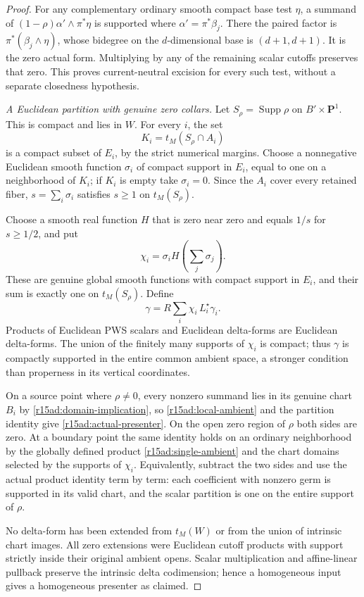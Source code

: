 \begin{proof}
For any complementary ordinary smooth compact base
test $\eta$, a summand of $(1-\rho)\alpha'\wedge\pi^*\eta$
is supported where $\alpha'=\pi^*\beta_j$.
There the paired factor is $\pi^*(\beta_j\wedge\eta)$,
whose bidegree on the $d$-dimensional base is
$(d+1,d+1)$.  It is the zero actual form.  Multiplying
by any of the remaining scalar cutoffs preserves that
zero.  This proves current-neutral excision for every
such test, without a separate closedness hypothesis.

\emph{A Euclidean partition with genuine zero collars.}
Let $S_\rho=\operatorname{Supp}\rho$ on
$B'\times\mathbf P^1$.  This is compact and lies in
$W$.  For every $i$, the set
\[
                      K_i=t_M(S_\rho\cap A_i)
\tag{AD15.6}\label{r15ad:compact-image}
\]
is a compact subset of $E_i$, by the strict numerical
margins.  Choose a nonnegative Euclidean smooth
function $\sigma_i$ of compact support in $E_i$,
equal to one on a neighborhood of $K_i$; if $K_i$
is empty take $\sigma_i=0$.  Since the $A_i$ cover
every retained fiber, $s=\sum_i\sigma_i$ satisfies
$s\geq1$ on $t_M(S_\rho)$.

Choose a smooth real function $H$ that is zero near
zero and equals $1/s$ for $s\geq1/2$, and put
\[
          \chi_i=\sigma_i H\!\left(\sum_j\sigma_j\right).
\tag{AD15.7}\label{r15ad:ambient-partition}
\]
These are genuine global smooth functions with compact
support in $E_i$, and their sum is exactly one on
$t_M(S_\rho)$.  Define
\[
           \gamma=R\sum_i\chi_i\,L_i^\star\gamma_i.
\tag{AD15.8}\label{r15ad:single-ambient}
\]
Products of Euclidean PWS scalars and Euclidean
delta-forms are Euclidean delta-forms.  The union of
the finitely many supports of $\chi_i$ is compact;
thus $\gamma$ is compactly supported in the entire
common ambient space, a stronger condition than
properness in its vertical coordinates.

On a source point where $\rho\ne0$, every nonzero
summand lies in its genuine chart $B_i$ by
\eqref{r15ad:domain-implication}, so
\eqref{r15ad:local-ambient} and the partition identity
give \eqref{r15ad:actual-presenter}.  On the open zero
region of $\rho$ both sides are zero.  At a boundary
point the same identity holds on an ordinary
neighborhood by the globally defined product
\eqref{r15ad:single-ambient} and the chart domains
selected by the supports of $\chi_i$.  Equivalently,
subtract the two sides and use the actual product
identity term by term: each coefficient with nonzero
germ is supported in its valid chart, and the scalar
partition is one on the entire support of $\rho$.

No delta-form has been extended from $t_M(W)$ or
from the union of intrinsic chart images.  All zero
extensions were Euclidean cutoff products with support
strictly inside their original ambient opens.  Scalar
multiplication and affine-linear pullback preserve
the intrinsic delta codimension; hence a homogeneous
input gives a homogeneous presenter as claimed.
\end{proof}

